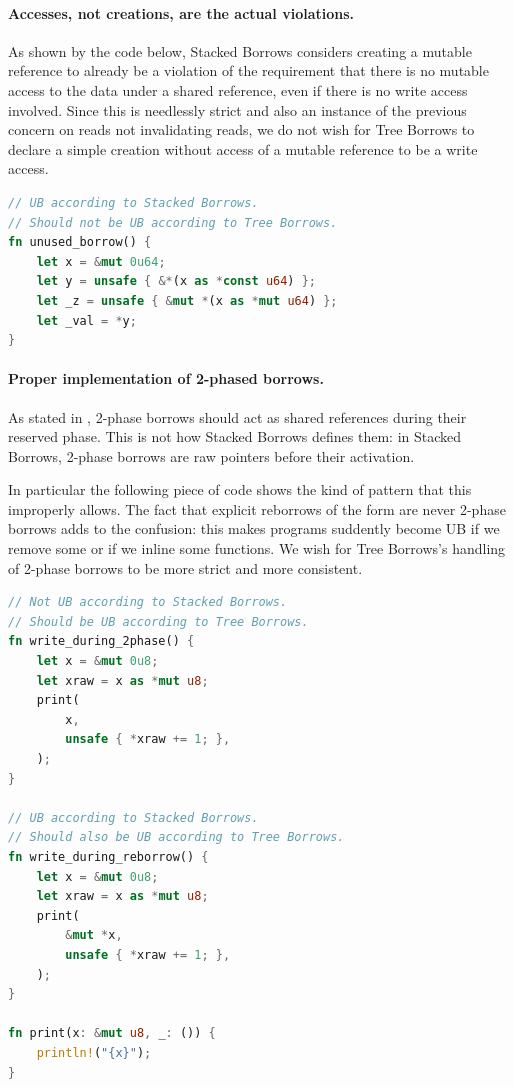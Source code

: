 \documentclass[a4paper,11pt]{article}
\theoremstyle{plain}
\theoremstyle{definition}
\theoremstyle{remark}
\newcommand{\tcode}[1]{\rstinline{#1}}
\begin{document}
\paragraph*{Accesses, not creations, are the actual violations.}
As shown by the code below, Stacked Borrows considers creating a mutable reference
to already be a violation of the requirement that there is no mutable access to
the data under a shared reference, even if there is no write access involved.
Since this is needlessly strict and also an instance of the previous concern on
reads not invalidating reads, we do not wish for Tree Borrows to declare a simple
creation without access of a mutable reference to be a write access.
\begin{lstlisting}[language=rust]
// UB according to Stacked Borrows.
// Should not be UB according to Tree Borrows.
fn unused_borrow() {
    let x = &mut 0u64;
    let y = unsafe { &*(x as *const u64) };
    let _z = unsafe { &mut *(x as *mut u64) };
    let _val = *y;
}
\end{lstlisting}

\paragraph*{Proper implementation of 2-phased borrows.}
As stated in \cite{rustc_dev_guide}, 2-phase borrows should act as shared references
during their reserved phase. This is not how Stacked Borrows defines them: in
Stacked Borrows, 2-phase borrows are raw pointers before their activation.

In particular the following piece of code shows the kind of pattern that this
improperly allows. The fact that explicit reborrows of the form \tcode{\&mut *x}
are never 2-phase borrows adds to the confusion: this makes programs suddently
become UB if we remove some \tcode{\&mut*} or if we inline some functions.
We wish for Tree Borrows's handling of 2-phase borrows to be more strict and
more consistent.
\begin{lstlisting}[language=rust]
// Not UB according to Stacked Borrows.
// Should be UB according to Tree Borrows.
fn write_during_2phase() {
    let x = &mut 0u8;
    let xraw = x as *mut u8;
    print(
        x,
        unsafe { *xraw += 1; },
    );
}

// UB according to Stacked Borrows.
// Should also be UB according to Tree Borrows.
fn write_during_reborrow() {
    let x = &mut 0u8;
    let xraw = x as *mut u8;
    print(
        &mut *x,
        unsafe { *xraw += 1; },
    );
}

fn print(x: &mut u8, _: ()) {
    println!("{x}");
}
\end{lstlisting}
\end{document}
